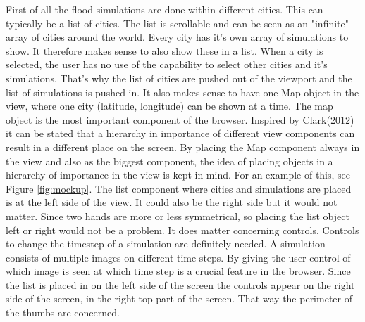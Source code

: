 First of all the flood simulations are done within different cities. This can typically be a list of cities. The list is scrollable and can be seen as an "infinite" array of cities around the world. Every city has it's own array of simulations to show. It therefore makes sense to also show these in a list. When a city is selected, the user has no use of the capability to select other cities and it's simulations. That's why the list of cities are pushed out of the viewport and the list of simulations is pushed in. 
It also makes sense to have one Map object in the view, where one city (latitude, longitude) can be shown at a time. The map object is the most important component of the browser. Inspired by Clark(2012) it can be stated that a hierarchy in importance of different view components can result in a different place on the screen. By placing the Map component always in the view and also as the biggest component, the idea of placing objects in a hierarchy of importance in the view is kept in mind. For an example of this, see Figure \ref{fig:mockup}.
The list component where cities and simulations are placed is at the left side of the view. It could also be the right side but it would not matter. Since two hands are more or less symmetrical, so placing the list object left or right would not be a problem. It does matter concerning controls. Controls to change the timestep of a simulation are definitely needed. A simulation consists of multiple images on different time steps. By giving the user control of which image is seen at which time step is a crucial feature in the browser. Since the list is placed in on the left side of the screen the controls appear on the right side of the screen, in the right top part of the screen. That way the perimeter of the thumbs are concerned.
